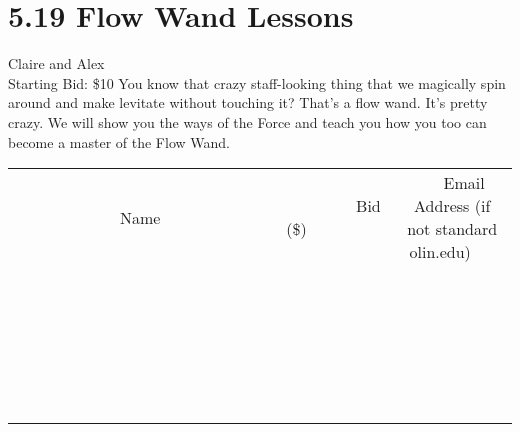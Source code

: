 \documentclass[11pt]{article}
\begin{document}
\section*{5.19 Flow Wand Lessons}
Claire and Alex
\\
Starting Bid: \$10
\newline
You know that crazy staff-looking thing that we magically spin around and make levitate without touching it? That's a flow wand. It's pretty crazy. We will show you the ways of the Force and teach you how you too can become a master of the Flow Wand.
\\[6ex]
\begin{tabular}{c c c}
~~~~~~~~~~~~~Name~~~~~~~~~~~~~ & ~~~~~~~~~Bid (\$)~~~~~~~~~  & ~~~Email Address (if not standard olin.edu)~~~\\
 & & \\
\hline
 & & \\
\hline
 & & \\
\hline
 & & \\
\hline
 & & \\
\hline
 & & \\
\hline
 & & \\
\hline
 & & \\
\hline
 & & \\
\hline
 & & \\
\hline
 & & \\
\hline
 & & \\
\hline
 & & \\
\hline
 & & \\
\hline
 & & \\
\hline
 & & \\
\hline
 & & \\
\hline
 & & \\
\hline
 & & \\
\hline
 & & \\
\hline
 & & \\
\hline
 & & \\
\hline
 & & \\
\hline
 & & \\
\hline
 & & \\
\hline
 & & \\
\hline
\end{tabular}
\newpage
\end{document}
